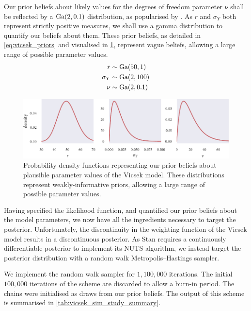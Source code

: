 Our prior beliefs about likely values for the degrees of freedom parameter $\nu$ shall be
reflected by a $\textrm{Ga}(2, 0.1)$ distribution, as popularised by \textcite{juarez10}.  As $r$
and $\sigma_Y$ both represent strictly positive measures, we shall use a gamma
distribution to quantify our beliefs about them. These prior beliefs, as detailed in
\cref{eq:vicsek_priors} and visualised in \cref{fig:vicsek_priors}, represent vague
beliefs, allowing a large range of possible parameter values.
\begin{align}
  \label{eq:vicsek_priors}
  \begin{split}
    r           & \sim \textrm{Ga}(50, 1) \\
    \sigma_Y    & \sim \textrm{Ga}(2, 100)\\
    \nu         & \sim \textrm{Ga}(2, 0.1)
  \end{split}
\end{align}
\begin{figure}[tb]
  \includegraphics{vicsek_priors.pdf}
  \caption{Probability density functions representing our prior beliefs about plausible
    parameter values of the Vicsek model. These distributions represent
    weakly-informative priors, allowing a large range of possible parameter values.}
  \label{fig:vicsek_priors}
\end{figure}

Having specified the likelihood function, and quantified our prior beliefs about the model
parameters, we now have all the ingredients necessary to target the posterior.
Unfortunately, the discontinuity in the weighting function of the Vicsek model results in
a discontinuous posterior. As Stan requires a continuously differentiable posterior to
implement its NUTS algorithm, we instead target the posterior distribution with a random
walk Metropolis--Hastings sampler.

We implement the random walk sampler for $1,100,000$ iterations. The initial $100,000$
iterations of the scheme are discarded to allow a burn-in period. The chains were
initialised as draws from our prior beliefs. The output of this scheme is summarised in
\cref{tab:vicsek_sim_study_summary}.

